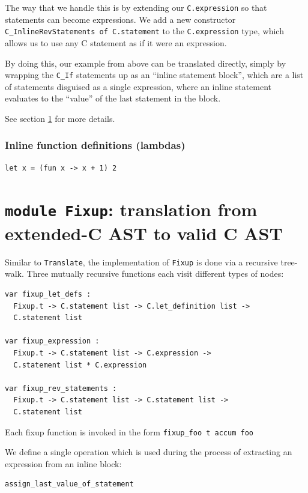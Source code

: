 \documentclass[12pt,a4paper,twoside,openright]{report}
\begin{document}
The way that we handle this is by extending our \lstinline!C.expression! so
that statements can become expressions.  We add a new constructor
\lstinline!C_InlineRevStatements of C.statement! to the
\lstinline!C.expression! type, which allows us to use any C statement as if it
were an expression.

By doing this, our example from above can be translated directly, simply by
wrapping the \lstinline!C_If! statements up as an ``inline statement block'',
which are a list of statements disguised as a single expression, where an
inline statement evaluates to the ``value'' of the last statement in the block.

See section \ref{module-fixup} for more details.


\subsubsection{Inline function definitions (lambdas)}\label{c-inline-functions}

\begin{lstlisting}
let x = (fun x -> x + 1) 2
\end{lstlisting}

\section{\texttt{module Fixup}: translation from extended-C AST to valid C AST}\label{module-fixup}

Similar to \lstinline!Translate!, the implementation of \lstinline!Fixup! is
done via a recursive tree-walk. Three mutually recursive functions each visit
different types of nodes:

\begin{lstlisting}
var fixup_let_defs :
  Fixup.t -> C.statement list -> C.let_definition list ->
  C.statement list

var fixup_expression :
  Fixup.t -> C.statement list -> C.expression ->
  C.statement list * C.expression

var fixup_rev_statements :
  Fixup.t -> C.statement list -> C.statement list ->
  C.statement list
\end{lstlisting}

Each fixup function is invoked in the form \lstinline!fixup_foo t accum foo!

We define a single operation which is used during the process of extracting an
expression from an inline block:

\begin{lstlisting}
assign_last_value_of_statement
\end{lstlisting}
\end{document}
